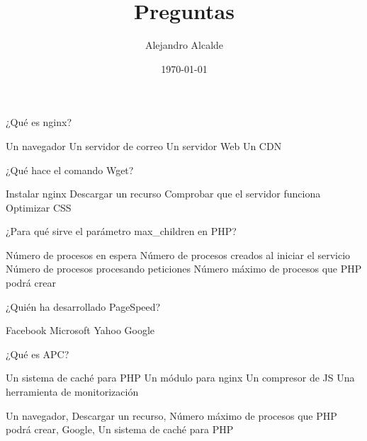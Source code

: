 \documentclass[addpoints,12pt]{exam}
\title{Preguntas}
\author{Alejandro Alcalde}
\date{\today}
\begin{document}
\begin{questions}
\question
¿Qué es nginx?\\
\begin{checkboxes}
\choice Un navegador
\choice Un servidor de correo
\choice Un servidor Web
\choice Un CDN
\end{checkboxes}



\question
¿Qué hace el comando Wget?\\
\begin{checkboxes}
\choice Instalar nginx
\choice Descargar un recurso
\choice Comprobar que el servidor funciona
\choice Optimizar CSS
\end{checkboxes}



\question
¿Para qué sirve el parámetro max\_children en PHP?\\
\begin{checkboxes}
\choice Número de procesos en espera
\choice Número de procesos creados al iniciar el servicio
\choice Número de procesos procesando peticiones
\choice Número máximo de procesos que PHP podrá crear
\end{checkboxes}



\question
¿Quién ha desarrollado PageSpeed?\\
\begin{checkboxes}
\choice Facebook
\choice Microsoft
\choice Yahoo
\choice Google
\end{checkboxes}



\question
¿Qué es APC?\\
\begin{checkboxes}
\choice Un sistema de caché para PHP
\choice Un módulo para nginx
\choice Un compresor de JS
\choice Una herramienta de monitorización
\end{checkboxes}
\end{questions}

\newpage

Un navegador, Descargar un recurso, Número máximo de procesos que PHP podrá crear, Google, Un sistema de caché para PHP
\end{document}
